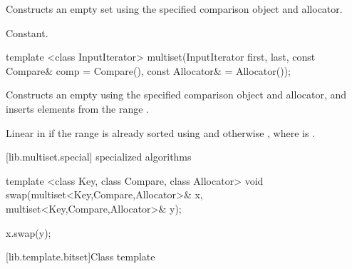 \begin{itemdescr}
\pnum
\effects
Constructs an empty set using the specified comparison object and allocator.

\pnum
\complexity
Constant.
\end{itemdescr}

%
%
\begin{itemdecl}
template <class InputIterator>
  multiset(InputIterator first, last,
           const Compare& comp = Compare(), const Allocator& = Allocator());
\end{itemdecl}

\begin{itemdescr}
\pnum
\effects
Constructs an empty
using the specified comparison object and allocator,
and inserts elements from the range
.

\pnum
\complexity
Linear in 
if the range
is already sorted using  and otherwise ,
where  is
.
\end{itemdescr}

[lib.multiset.special]{ specialized algorithms}

%
%
\begin{itemdecl}
template <class Key, class Compare, class Allocator>
  void swap(multiset<Key,Compare,Allocator>& x,
            multiset<Key,Compare,Allocator>& y);
\end{itemdecl}

\begin{itemdescr}
\pnum
\effects
\begin{codeblock}
    x.swap(y);
\end{codeblock}
\end{itemdescr}

[lib.template.bitset]{Class template }%

%

